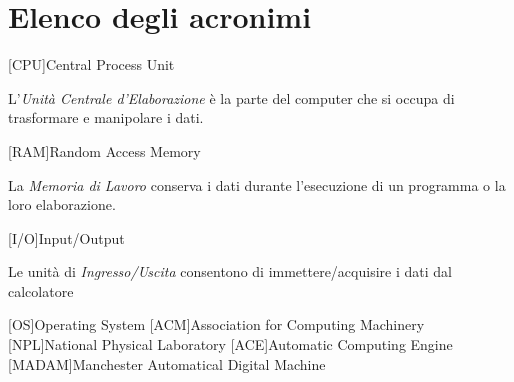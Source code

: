 \chapter{Elenco degli acronimi}
\begin{acronym}[MADAM]
	[CPU]{Central Process Unit}
{\small\par\noindent L'\emph{Unità Centrale d'Elaborazione} è la parte del computer che si occupa di trasformare e manipolare i dati.}
	[RAM]{Random Access Memory}
{\small\par\noindent La \emph{Memoria di Lavoro} conserva i dati durante l'esecuzione di un programma o la loro elaborazione.}
	[I/O]{Input/Output}
{\small\par\noindent Le unità di \emph{Ingresso/Uscita} consentono di immettere/acquisire i dati dal calcolatore}
	[OS]{Operating System}
	[ACM]{Association for Computing Machinery}
	[NPL]{National Physical Laboratory}
	[ACE]{Automatic Computing Engine}
	[MADAM]{Manchester Automatical Digital Machine}
\end{acronym}